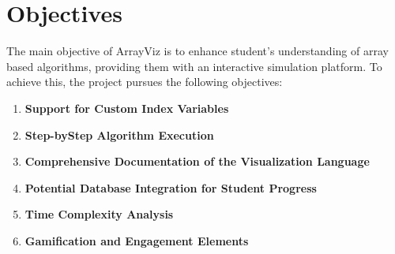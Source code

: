 \documentclass{article}
\begin{document}
\section{Objectives}
The main objective of ArrayViz is to enhance student's understanding of array based algorithms, providing them with an interactive simulation platform. To achieve this, the project pursues the following objectives:

\begin{enumerate}
    \item \textbf{Support for Custom Index Variables}
    \item \textbf{Step-byStep Algorithm Execution}
    \item \textbf{Comprehensive Documentation of the Visualization Language}
    \item \textbf{Potential Database Integration for Student Progress}
    \item \textbf{Time Complexity Analysis}
    \item \textbf{Gamification and Engagement Elements}
\end{enumerate}
\end{document}
